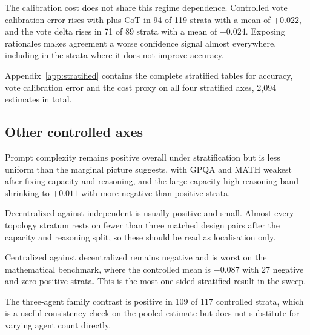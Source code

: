 The calibration cost does not share this regime dependence. Controlled vote calibration
error rises with plus-CoT in 94 of 119 strata with a mean of $+0.022$, and the vote delta
rises in 71 of 89 strata with a mean of $+0.024$. Exposing rationales makes agreement a
worse confidence signal almost everywhere, including in the strata where it does not
improve accuracy.

Appendix~\ref{app:stratified} contains the complete stratified tables for accuracy, vote
calibration error and the cost proxy on all four stratified axes, 2{,}094 estimates in
total.

\subsection{Other controlled axes}

Prompt complexity remains positive overall under stratification but is less uniform than
the marginal picture suggests, with GPQA and MATH weakest after fixing capacity and
reasoning, and the large-capacity high-reasoning band shrinking to $+0.011$ with more
negative than positive strata.

Decentralized against independent is usually positive and small. Almost every topology
stratum rests on fewer than three matched design pairs after the capacity and reasoning
split, so these should be read as localisation only.

Centralized against decentralized remains negative and is worst on the mathematical
benchmark, where the controlled mean is $-0.087$ with 27 negative and zero positive
strata. This is the most one-sided stratified result in the sweep.

The three-agent family contrast is positive in 109 of 117 controlled strata, which is a
useful consistency check on the pooled estimate but does not substitute for varying agent
count directly.
